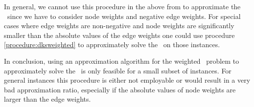 In general, we cannot use this procedure in the above from to approximate the \WIkSP\ since we have to consider node weights and negative edge weights. For special cases where edge weights are non-negative and node weights are significantly smaller than the absolute values of the edge weights one could use procedure \ref{procedure:dksweighted} to approximately solve the \WIkSP\ on those instances.\medskip

In conclusion, using an approximation algorithm for the weighted \DkS\ problem to approximately solve the \WIkSP\ is only feasible for a small subset of instances. For general instances this procedure is either not employable or would result in a very bad approximation ratio, especially if the absolute values of node weights are larger than the edge weights.